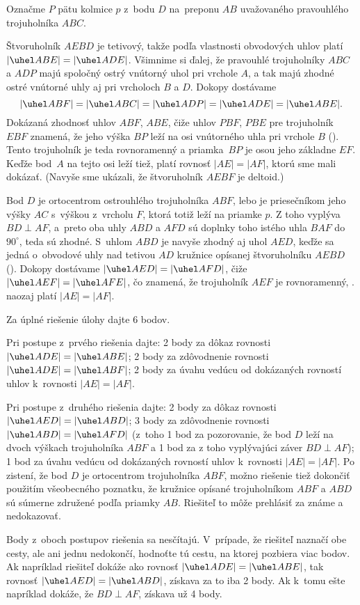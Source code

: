 {%
Označme $P$ pätu kolmice $p$ z~bodu $D$ na~preponu
$AB$ uvažovaného pravouhlého trojuholníka $ABC$.

Štvoruholník $AEBD$ je tetivový, takže podľa vlastnosti
obvodových uhlov platí $|\uhel ABE|=|\uhel ADE|$. Všimnime si ďalej,
že pravouhlé trojuholníky $ABC$ a $ADP$ majú spoločný ostrý vnútorný uhol
pri vrchole $A$, a tak majú zhodné ostré vnútorné uhly aj pri
vrcholoch $B$ a $D$. Dokopy dostávame
$$
|\uhel ABF|=|\uhel ABC|=|\uhel ADP|=|\uhel ADE|=|\uhel ABE|.
$$
Dokázaná zhodnosť uhlov $ABF$, $ABE$, čiže uhlov $PBF$, $PBE$
pre trojuholník $EBF$ znamená, že jeho výška $BP$ leží
na osi vnútorného uhla pri vrchole $B$ (\obr).
Tento trojuholník je teda rovnoramenný
a priamka~$BP$ je osou jeho základne $EF$.
Keďže bod~$A$ na tejto osi leží tiež,
platí rovnosť $|AE|=|AF|$, ktorú sme mali dokázať.
(Navyše sme ukázali, že štvoruholník $AEBF$ je deltoid.)
%

\Jres
Bod $D$ je ortocentrom ostrouhlého
trojuholníka $ABF$, lebo je priesečníkom jeho výšky $AC$ s~výškou
z~vrcholu $F$, ktorá totiž leží na priamke $p$. Z toho vyplýva
$BD\perp AF$, a~preto oba uhly $ABD$ a $AFD$ sú doplnky toho istého uhla
$BAF$ do $90^\circ$, teda sú zhodné. S~uhlom $ABD$
je navyše zhodný aj uhol $AED$, keďže sa jedná o~obvodové uhly
nad tetivou $AD$ kružnice opísanej štvoruholníku $AEBD$ (\obr).
Dokopy dostávame $|\uhel AED|=|\uhel AFD|$, čiže
$|\uhel AEF|=|\uhel AFE|$, čo znamená, že trojuholník $AEF$ je
rovnoramenný, \tj. naozaj platí $|AE|=|AF|$.
%

\schemaABC
Za úplné riešenie úlohy dajte 6 bodov.

Pri postupe z~prvého riešenia dajte: 2 body za dôkaz rovnosti
$|\uhel ADE|=|\uhel ABE|$; 2 body za zdôvodnenie rovnosti
$|\uhel ADE|=|\uhel ABF|$; 2 body za úvahu vedúcu
od dokázaných rovností uhlov k~rovnosti $|AE|=|AF|$.

Pri postupe z~druhého riešenia dajte:
2 body za dôkaz rovnosti $|\uhel AED|=|\uhel ABD|$;
3 body za zdôvodnenie rovnosti $|\uhel ABD|=|\uhel AFD|$
(z~toho 1 bod za pozorovanie, že bod $D$ leží na dvoch výškach
trojuholníka $ABF$ a 1 bod za z toho vyplývajúci záver $BD\perp AF$);
1 bod za úvahu vedúcu od dokázaných rovností uhlov k~rovnosti
$|AE|=|AF|$. Po zistení, že bod $D$ je ortocentrom trojuholníka
$ABF$, možno riešenie tiež dokončiť použitím všeobecného poznatku,
že kružnice opísané trojuholníkom $ABF$ a $ABD$ sú súmerne združené
podľa priamky $AB$. Riešiteľ to môže prehlásiť za známe a
nedokazovať.

Body z~oboch postupov riešenia sa nesčítajú. V~prípade, že
riešiteľ naznačí obe cesty, ale ani jednu nedokončí, hodnoťte tú cestu,
na ktorej pozbiera viac bodov. Ak napríklad riešiteľ dokáže ako
rovnosť $|\uhel ADE|=|\uhel ABE|$, tak rovnosť $|\uhel AED|=|\uhel ABD|$, získava za to iba 2 body.
Ak k~tomu ešte napríklad dokáže, že $BD\perp AF$,
získava už 4 body.
\endschema

}

